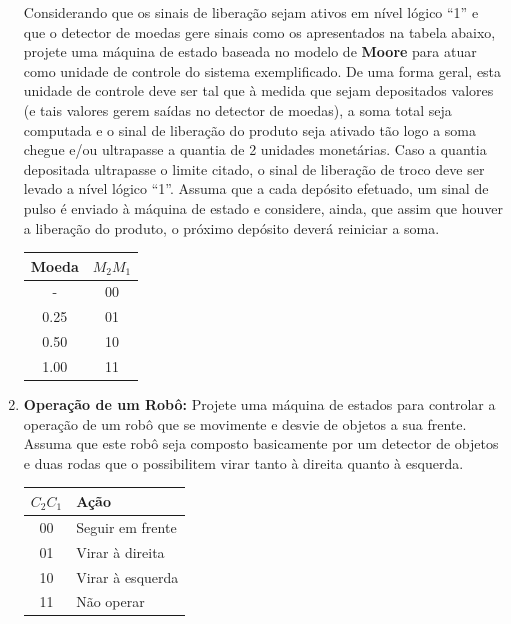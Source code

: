 \documentclass[12pt]{article}
\begin{document}
\begin{enumerate}[label=\textbf{\arabic*.}]
    Considerando que os sinais de liberação sejam ativos em nível lógico ``1'' e que o detector de moedas gere sinais como os apresentados na tabela abaixo, projete uma máquina de estado baseada no modelo de \textbf{Moore} para atuar como unidade de controle do sistema exemplificado. De uma forma geral, esta unidade de controle deve ser tal que à medida que sejam depositados valores (e tais valores gerem saídas no detector de moedas), a soma total seja computada e o sinal de liberação do produto seja ativado tão logo a soma chegue e/ou ultrapasse a quantia de 2 unidades monetárias. Caso a quantia depositada ultrapasse o limite citado, o sinal de liberação de troco deve ser levado a nível lógico ``1''. Assuma que a cada depósito efetuado, um sinal de pulso é enviado à máquina de estado e considere, ainda, que assim que houver a liberação do produto, o próximo depósito deverá reiniciar a soma.

    \begin{table}[H]
        \centering
        \begin{tabular}{|c|c|}
            \hline
            \textbf{Moeda} & \textbf{$M_2 M_1$} \\ \hline
            - & 00 \\ \hline
            0.25 & 01 \\ \hline
            0.50 & 10 \\ \hline
            1.00 & 11 \\ \hline
        \end{tabular}
    \end{table}

    \vspace{2em}

    \item \textbf{Operação de um Robô:} Projete uma máquina de estados para controlar a operação de um robô que se movimente e desvie de objetos a sua frente. Assuma que este robô seja composto basicamente por um detector de objetos e duas rodas que o possibilitem virar tanto à direita quanto à esquerda.
    
    \begin{table}[H]
        \centering
        \begin{tabular}{|c|l|}
            \hline
            \textbf{$C_2 C_1$} & \textbf{Ação} \\ \hline
            00 & Seguir em frente \\ \hline
            01 & Virar à direita \\ \hline
            10 & Virar à esquerda \\ \hline
            11 & Não operar \\ \hline
        \end{tabular}
    \end{table}


\end{enumerate}
\end{document}
